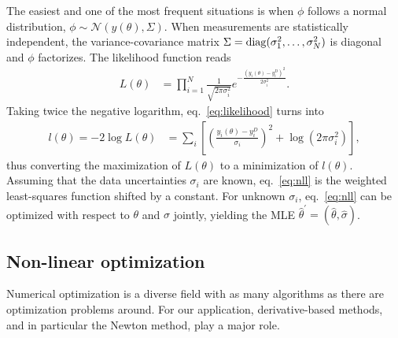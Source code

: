 \documentclass[article]{jss}
\begin{document}
The easiest and one of the most frequent situations is when $\phi$ follows a normal distribution, $\phi\sim\mathcal N(y(\theta), \Sigma)$. When measurements are statistically independent, the variance-covariance matrix $\Sigma = {\rm diag}(\sigma_1^2, \dots, \sigma_N^2)$ is diagonal and $\phi$ factorizes. The likelihood function reads 
\begin{align}
	L(\theta) &= \prod_{i = 1}^N \frac{1}{\sqrt{2\pi\sigma_i^2}} e^{-\frac{(y_i(\theta)-y_i^D)^2}{2\sigma_i^2}} .
	\label{eq:likelihood}
\end{align}
Taking twice the negative logarithm, eq.~\eqref{eq:likelihood} turns into
\begin{align}
	l(\theta) = -2\log L(\theta) &= \sum_i \left[\left(\frac{y_i(\theta) - y_i^D}{\sigma_i}\right)^2 + \log(2\pi\sigma_i^2)\right],
	\label{eq:nll}
\end{align}
thus converting the maximization of $L(\theta)$ to a minimization of $l(\theta)$.
Assuming that the data uncertainties $\sigma_i$ are known, eq.~\eqref{eq:nll} is the weighted least-squares function shifted by a constant. For unknown $\sigma_i$, eq.~\eqref{eq:nll} can be optimized with respect to $\theta$ and $\sigma$ jointly, yielding the MLE $\hat\theta^{\prime} = (\hat\theta, \hat\sigma)$.

\subsection{Non-linear optimization}

Numerical optimization is a diverse field with as many algorithms as there are optimization problems around. For our application, derivative-based methods, and in particular the Newton method, play a major role.
\end{document}

